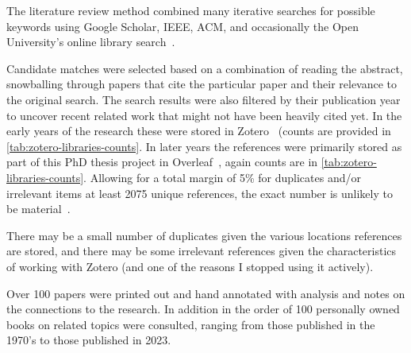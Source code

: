 The literature review method combined many iterative searches for possible keywords using Google Scholar, IEEE, ACM, and occasionally the Open University's online library search~. 

Candidate matches were selected based on a combination of reading the abstract, snowballing through papers that cite the particular paper and their relevance to the original search. The search results were also filtered by their publication year to uncover recent related work that might not have been heavily cited yet. In the early years of the research these were stored in Zotero~ (counts are provided in \ref{tab:zotero-libraries-counts}. In later years the references were primarily stored as part of this PhD thesis project in Overleaf~, again counts are in \ref{tab:zotero-libraries-counts}. Allowing for a total margin of 5\% for duplicates and/or irrelevant items at least 2075 unique references, the exact number is unlikely to be material~.

There may be a small number of duplicates given the various locations references are stored, and there may be some irrelevant references given the characteristics of working with Zotero (and one of the reasons I stopped using it actively).

Over 100 papers were printed out and hand annotated with analysis and notes on the connections to the research. In addition in the order of 100 personally owned books on related topics were consulted, ranging from those published in the 1970's to those published in 2023.

